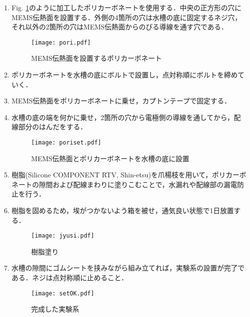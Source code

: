 \begin{enumerate}

\item Fig. \ref{12}のように加工したポリカーボネートを使用する．中央の正方形の穴にMEMS伝熱面を設置する．外側の4箇所の穴は水槽の底に固定するネジ穴，それ以外の2箇所の穴はMEMS伝熱面からのびる導線を通す穴である．
 
 
\begin{figure}[ht]
\vspace{0zh}
\begin{center}
\texttt{[image: pori.pdf]}
\vspace{-3zh}
\caption{MEMS伝熱面を設置するポリカーボネート}\label{12}
\end{center}
\vspace{0zh}
\end{figure}


\item ポリカーボネートを水槽の底にボルトで設置し，点対称順にボルトを締めていく．
\item MEMS伝熱面をポリカーボネートに乗せ，カプトンテープで固定する．
\item 水槽の底の端を何かに乗せ，2箇所の穴から電極側の導線を通してから，配線部分のはんだをする．


 \begin{figure}[ht]
\vspace{0zh}
\begin{center}
\texttt{[image: poriset.pdf]}
\vspace{-5zh}
\caption{ MEMS伝熱面とポリカーボネートを水槽の底に設置}\label{ wafer}
\end{center}
\vspace{0zh}
\end{figure}


\item 樹脂(Silicone COMPONENT RTV, Shin-etsu)を爪楊枝を用いて，ポリカーボネートの隙間および配線まわりに塗りこむことで，水漏れや配線部の漏電防止を行う．
\item 樹脂を固めるため，埃がつかないよう箱を被せ，通気良い状態で1日放置する．

 
  \begin{figure}[ht]
\vspace{0zh}
\begin{center}
\texttt{[image: jyusi.pdf]}
\vspace{-1zh}
\caption{樹脂塗り}\label{ wafer}
\end{center}
\vspace{0zh}
\end{figure}


\item 水槽の隙間にゴムシートを挟みながら組み立てれば，実験系の設置が完了である．ネジは点対称順に止めること．

 
  \begin{figure}[ht]
\vspace{0zh}
\begin{center}
\texttt{[image: setOK.pdf]}
\vspace{0zh}
\caption{完成した実験系}\label{ wafer}
\end{center}
\vspace{0zh}
\end{figure}


\end{enumerate} 
